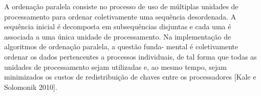 A ordenação paralela consiste no processo de uso de múltiplas unidades de processamento para ordenar coletivamente uma sequência desordenada. A sequência inicial é decomposta em subsequências disjuntas e cada uma é associada a uma única unidade de processamento. Na implementação de algoritmos de ordenação paralela, a questão funda- mental é coletivamente ordenar os dados pertencentes a processos individuais, de tal forma que todas as unidades de processamento sejam utilizadas e, ao mesmo tempo, sejam minimizados os custos de redistribuição de chaves entre os processadores [Kale e Solomonik 2010].